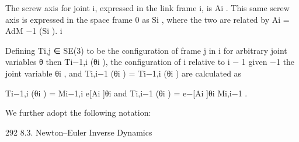 \documentclass[12pt,a4paper]{article}
\begin{document}
    The screw axis for joint i, expressed in the link frame {i}, is Ai . This same
screw axis is expressed in the space frame {0} as Si , where the two are related
by
                                 Ai = AdM −1 (Si ).
                                                      i

Defining Ti,j ∈ SE(3) to be the configuration of frame {j} in {i} for arbitrary
joint variables θ then Ti−1,i (θi ), the configuration of {i} relative to {i − 1} given
                                            −1
the joint variable θi , and Ti,i−1 (θi ) = Ti−1,i (θi ) are calculated as

         Ti−1,i (θi ) = Mi−1,i e[Ai ]θi         and        Ti,i−1 (θi ) = e−[Ai ]θi Mi,i−1 .

    We further adopt the following notation:


292                                                       8.3. Newton–Euler Inverse Dynamics
\end{document}
